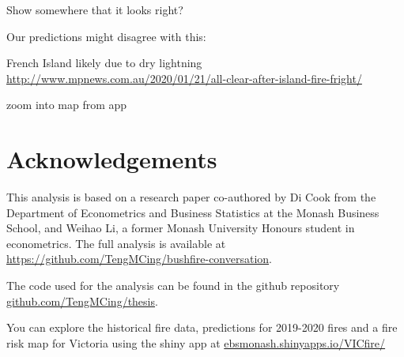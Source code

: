 \documentclass[
  11pt,
  a4paper,
]{article}
\begin{document}
Show somewhere that it looks right?

Our predictions might disagree with this:

French Island likely due to dry lightning
\url{http://www.mpnews.com.au/2020/01/21/all-clear-after-island-fire-fright/}

zoom into map from app

\hypertarget{acknowledgements}{%
\section{Acknowledgements}\label{acknowledgements}}

This analysis is based on a research paper co-authored by Di Cook from the Department of Econometrics and Business Statistics at the Monash Business School, and Weihao Li, a former Monash University Honours student in econometrics. The full analysis is available at \url{https://github.com/TengMCing/bushfire-conversation}.

The code used for the analysis can be found in the github repository \href{https://github.com/TengMCing/thesis}{github.com/TengMCing/thesis}.

You can explore the historical fire data, predictions for 2019-2020 fires and a fire risk map for Victoria using the shiny app at \href{https://ebsmonash.shinyapps.io/VICfire/}{ebsmonash.shinyapps.io/VICfire/}

\printbibliography
\end{document}

